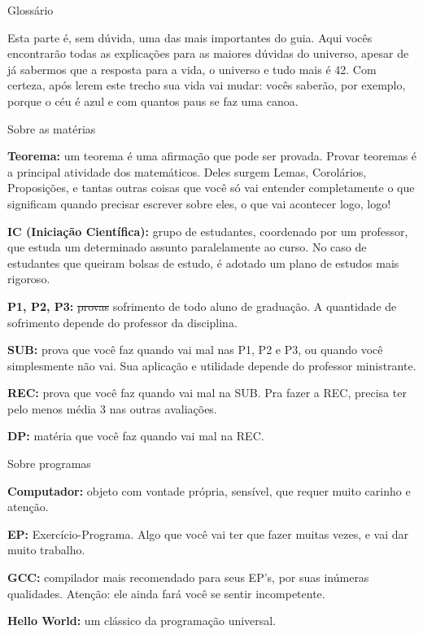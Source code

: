 \begin{secao}{Glossário}

Esta parte é, sem dúvida, uma das mais importantes do guia. Aqui vocês
encontrarão todas as explicações para as maiores dúvidas do universo, apesar de
já sabermos que a resposta para a vida, o universo e tudo mais é 42. Com
certeza, após lerem este trecho sua vida vai mudar: vocês saberão, por exemplo,
porque o céu é azul e com quantos paus se faz uma canoa.

\begin{subsecao}{Sobre as matérias}

{\bf Teorema:} um teorema é uma afirmação que pode ser provada. Provar
teoremas é a principal atividade dos matemáticos. Deles surgem Lemas,
Corolários, Proposições, e tantas outras coisas que você só vai entender
completamente o que significam quando precisar escrever sobre eles, o que vai
acontecer logo, logo!

{\bf IC (Iniciação Científica):} grupo de estudantes, coordenado por um
professor, que estuda um determinado assunto paralelamente ao curso. No caso de
estudantes que queiram bolsas de estudo, é adotado um plano de estudos mais
rigoroso.

{\bf P1, P2, P3:} \sout{provas} sofrimento de todo aluno de graduação. A quantidade de
sofrimento depende do professor da disciplina.

{\bf SUB:} prova que você faz quando vai mal nas P1, P2 e P3, ou quando você
simplesmente não vai. Sua aplicação e utilidade depende do professor
ministrante.

{\bf REC:} prova que você faz quando vai mal na SUB. Pra fazer a REC, precisa
ter pelo menos média 3 nas outras avaliações.

{\bf DP:} matéria que você faz quando vai mal na REC.
\end{subsecao}

\begin{subsecao}{Sobre programas}

{\bf Computador:} objeto com vontade própria, sensível, que requer muito
carinho e atenção.

{\bf EP:} Exercício-Programa. Algo que você vai ter que fazer muitas vezes, e
vai dar muito trabalho.

{\bf GCC:} compilador mais recomendado para seus EP's, por suas inúmeras
qualidades. Atenção: ele ainda fará você se sentir incompetente.

{\bf Hello World:} um clássico da programação universal.


\end{subsecao}
\end{secao}

